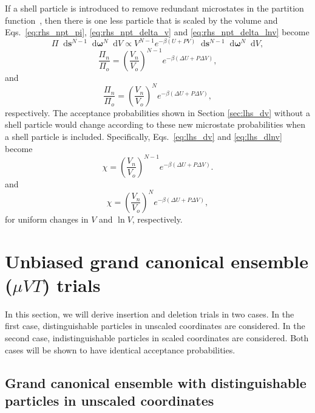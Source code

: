 \documentclass[
  9pt,
  bestpractices,
  pubversion,
]{livecoms}
\newcommand*\diff{\mathop{}\!\mathrm{d}}
\begin{document}
If a shell particle is introduced to remove redundant microstates in the partition function~\cite{attard_density_1995, koper_length_1996, corti_deriving_1998, han_isothermal-isobaric_2001, corti_isothermal-isobaric_2001, corti_monte_2002, stroker_systematic_2021, hatch_theory_2024}, then there is one less particle that is scaled by the volume and Eqs.~\ref{eq:rhs_npt_pi}, \ref{eq:rhs_npt_delta_v} and \ref{eq:rhs_npt_delta_lnv} become
\begin{equation}
\Pi \diff\mathbf{s}^{N-1}\diff\boldsymbol{\omega}^{N}\diff V \propto V^{N-1} e^{-\beta(U+P V)} \diff\mathbf{s}^{N-1} \diff\boldsymbol{\omega}^{N}\diff V,
\end{equation}
\begin{equation}
\frac{\Pi_n}{\Pi_o} = \left(\frac{V_n}{V_o}\right)^{N-1}e^{-\beta(\Delta U + P\Delta V)},
\end{equation}
and
\begin{equation}
\frac{\Pi_n}{\Pi_o} = \left(\frac{V_n}{V_o}\right)^{N}e^{-\beta(\Delta U + P\Delta V)},
\end{equation}
respectively.
The acceptance probabilities shown in Section \ref{sec:lhs_dv} without a shell particle would change according to these new microstate probabilities when a shell particle is included.
Specifically, Eqs.~\ref{eq:lhs_dv} and \ref{eq:lhs_dlnv} become
\begin{equation}
\chi=\left(\frac{V_n}{V_o}\right)^{N-1}e^{-\beta(\Delta U + P\Delta V)}.
\end{equation}
and
\begin{equation}
\chi=\left(\frac{V_n}{V_o}\right)^{N}e^{-\beta(\Delta U + P\Delta V)},
\end{equation}
for uniform changes in $V$ and $\ln V$, respectively.

\section{\label{sec:rhs_muvt}Unbiased grand canonical ensemble ($\mu VT$) trials}

In this section, we will derive insertion and deletion trials in two cases.
In the first case, distinguishable particles in unscaled coordinates are considered.
In the second case, indistinguishable particles in scaled coordinates are considered.
Both cases will be shown to have identical acceptance probabilities.

\subsection{\label{sec:rhs_muvt_distinguishable}Grand canonical ensemble with distinguishable particles in unscaled coordinates}
\end{document}
